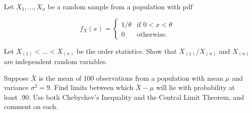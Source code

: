 \documentclass[12pt,letterpaper]{exam}
\begin{document}
\begin{questions}
	\setcounter{question}{23}
	\question 
	Let \(X_1,\ldots, X_n\) be a random sample from a population with pdf
	
	\[
	f_X(x)=
	\begin{cases}
		1/\theta & \text{if } 0 < x < \theta \\
		0 	& \text{otherwise}.
	\end{cases}
	\]
	
	Let \(X_{(1)} < \ldots < X_{(n)}\) be the order statistics. 
	Show that \(X_{(1)}/X_{(n)}\) and \(X_{(n)}\) are independent random variables.
	
	\begin{solution}
		
	\end{solution}

	\setcounter{question}{30}
	\question
	Suppose \(\bar{X}\) is the mean of 100 observations from a population with mean \(\mu\) and variance \(\sigma^2 = 9\). 
	Find limits between which \(\bar{X}-\mu\) will lie with probability at least \(.90\). 
	Use both Chebychev’s Inequality and the Central Limit Theorem, and comment on each. 
	
	\begin{solution}
		
	\end{solution}
		

\end{questions}
\end{document}
